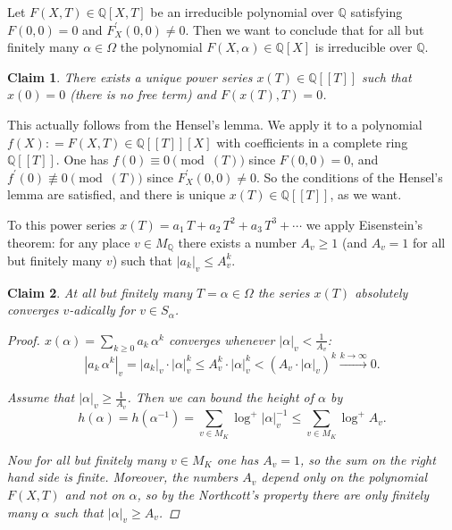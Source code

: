\documentclass{article}
\newcommand{\dfn}{\mathrel{\mathop:}=}
\newcommand{\QQ}{\mathbb{Q}}
\theoremstyle{myplain}
\newtheorem*{claim}{Claim}
\theoremstyle{mydefinition}
\begin{document}
Let $F (X,T) \in \QQ [X,T]$ be an irreducible polynomial over $\QQ$ satisfying
$F (0,0) = 0$ and $F^\prime_X (0,0) \ne 0$. Then we want to conclude that for
all but finitely many $\alpha \in \Omega$ the polynomial
$F (X, \alpha) \in \QQ [X]$ is irreducible over $\QQ$.

\begin{claim}
  There exists a unique power series $x (T) \in \QQ [\![T]\!]$ such that
  $x (0) = 0$ (there is no free term) and $F (x(T),T) = 0$.
\end{claim}

This actually follows from the Hensel's lemma. We apply it to a polynomial
$f (X) \dfn F (X,T) \in \QQ [\![T]\!] [X]$ with coefficients in a complete ring
$\QQ [\![T]\!]$. One has $f (0) \equiv 0 \pmod{(T)}$ since $F (0,0) = 0$, and
$f^\prime (0) \not\equiv 0 \pmod{(T)}$ since $F^\prime_X (0,0) \ne 0$. So the
conditions of the Hensel's lemma are satisfied, and there is unique
$x (T) \in \QQ [\![T]\!]$, as we want.

To this power series $x (T) = a_1\,T + a_2\,T^2 + a_3\,T^3 + \cdots$ we apply
Eisenstein's theorem: for any place $v \in M_\QQ$ there exists a number
$A_v \ge 1$ (and $A_v = 1$ for all but finitely many $v$) such that
$|a_k|_v \le A_v^k$.

\begin{claim}
  At all but finitely many $T = \alpha \in \Omega$ the series $x (T)$ absolutely
  converges $v$-adically for $v \in S_\alpha$.

  \begin{proof}
    $x (\alpha) = \sum_{k \ge 0} a_k\,\alpha^k$ converges whenever
    $|\alpha|_v < \frac{1}{A_v}$:
    \[ |a_k \, \alpha^k|_v =
      |a_k|_v \cdot |\alpha|^k_v \le A_v^k \cdot |\alpha|_v^k <
      (A_v \cdot |\alpha|_v)^k \xrightarrow{k\to\infty} 0. \]

    Assume that $|\alpha|_v \ge \frac{1}{A_v}$. Then we can bound the height of
    $\alpha$ by
    \[ h (\alpha) = h (\alpha^{-1}) =
      \sum_{v\in M_K} \log^+ |\alpha|^{-1}_v \le
      \sum_{v\in M_K} \log^+ A_v. \]

    Now for all but finitely many $v\in M_K$ one has $A_v = 1$, so the sum on
    the right hand side is finite. Moreover, the numbers $A_v$ depend only on
    the polynomial $F (X,T)$ and not on $\alpha$, so by the Northcott's property
    there are only finitely many $\alpha$ such that $|\alpha|_v \ge A_v$.
  \end{proof}
\end{claim}
\end{document}
